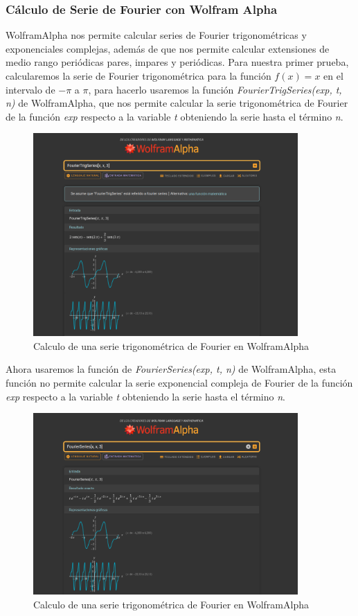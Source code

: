 \subsubsection{Cálculo de Serie de Fourier con Wolfram Alpha}
WolframAlpha nos permite calcular series de Fourier trigonométricas y exponenciales complejas, además de que nos permite calcular extensiones de medio rango periódicas pares, impares y periódicas.
Para nuestra primer prueba, calcularemos la serie de Fourier trigonométrica para la función \( f(x) = x \) en el intervalo de \(-\pi\) a \(\pi\), para hacerlo usaremos la función \emph{FourierTrigSeries(exp, t, n)} de WolframAlpha, que nos permite calcular la serie trigonométrica de Fourier de la función \emph{exp} respecto a la variable \emph{t} obteniendo la serie hasta el término \emph{n}.
\begin{figure}[H]
	\centering
	\includegraphics[width=0.9\textwidth]{img/chapter02/wolfram_trig_series.png}
	\caption{Calculo de una serie trigonométrica de Fourier en WolframAlpha}
	\label{fig:wolfram-trig-series}  %
\end{figure}
Ahora usaremos la función de \emph{FourierSeries(exp, t, n)} de WolframAlpha, esta función no permite calcular la serie exponencial compleja de Fourier de la función \emph{exp} respecto a la variable \emph{t} obteniendo la serie hasta el término \emph{n}.
\begin{figure}[H]
	\centering
	\includegraphics[width=0.9\textwidth]{img/chapter02/wolfram_complex_series.png}
	\caption{Calculo de una serie trigonométrica de Fourier en WolframAlpha}
	\label{fig:wolfram-exp-series}  %
\end{figure}
